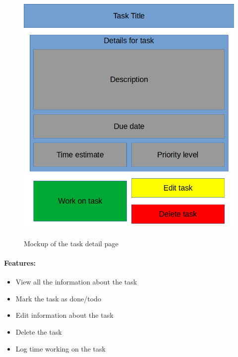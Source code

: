 \documentclass{article}
\begin{document}
\begin{minipage}{0.5\textwidth}
	\begin{figure}[H]
		\includegraphics[width=\linewidth]{Mockups/task_detail.png}
		\label{fig:task_detail_mockup}
		\caption{Mockup of the task detail page}
	\end{figure}
\end{minipage} \hfill
\begin{minipage}{0.45\textwidth}
	\paragraph{Features:}
	\begin{samepage}
		\begin{itemize}
			\item View all the information about the task
			\item Mark the task as done/todo
			\item Edit information about the task
			\item Delete the task
			\item Log time working on the task
		\end{itemize}
	\end{samepage}
\end{minipage}
\end{document}
